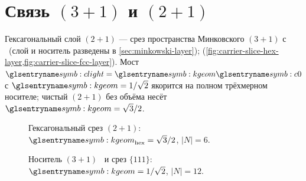 \section{Связь $(3{+}1)$ и $(2{+}1)$}
\label{sec:31-21-slice}

Гексагональный слой $(2{+}1)$ --- срез пространства Минковского $(3{+}1)$ с \latGCKshort\
(слой и носитель разведены в \cref{sec:minkowski-layer});
(\cref{fig:carrier-slice-hex-layer,fig:carrier-slice-fcc-layer}).
Мост $\speedC=\caKappaGeom \caSignalSpeed$ с $\caKappaGeom=1/\sqrt{2}$ якорится на полном трёхмерном носителе;
чистый $(2{+}1)$ без объёма несёт $\caKappaGeom=\sqrt{3}/2$.

\begin{figure}[htbp]
  \centering
  
  \caption{Гексагональный срез $(2{+}1)$: $\caKappaGeom_{\mathrm{hex}}=\sqrt{3}/2$, $|N|=6$.}
  \label{fig:carrier-slice-hex-layer}
\end{figure}

\begin{figure}[htbp]
  \centering
  
  \caption{Носитель $(3{+}1)$ \latGCKshort\ и срез $\{111\}$: $\caKappaGeom=1/\sqrt{2}$, $|N|=12$.}
  \label{fig:carrier-slice-fcc-layer}
\end{figure}

